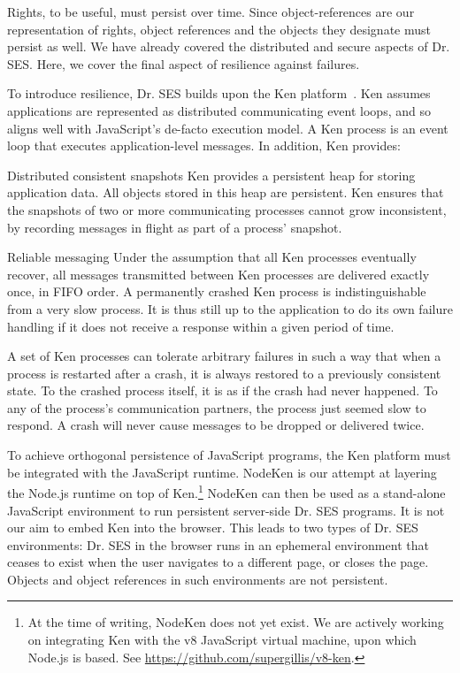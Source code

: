 \documentclass{llncs}
\begin{document}
Rights, to be useful, must persist over time. Since object-references are our representation of rights, object references and the objects they designate must persist as well. We have already covered the distributed and secure aspects of Dr. SES. Here, we cover the final aspect of resilience against failures.

To introduce resilience, Dr. SES builds upon the Ken platform~\cite{Yoo:CKen}. Ken assumes applications are represented as distributed communicating event loops, and so aligns well with JavaScript's de-facto execution model. A Ken process is an event loop that executes application-level messages. In addition, Ken provides:

\begin{description*}
  \item[Distributed consistent snapshots] Ken provides a persistent heap for storing application data. All objects stored in this heap are persistent. Ken ensures that the snapshots of two or more communicating processes cannot grow inconsistent, by recording messages in flight as part of a process' snapshot.
  \item[Reliable messaging] Under the assumption that all Ken processes eventually recover, all messages transmitted between Ken processes are delivered exactly once, in FIFO order. A permanently crashed Ken process is indistinguishable from a very slow process. It is thus still up to the application to do its own failure handling if it does not receive a response within a given period of time.
\end{description*}

A set of Ken processes can tolerate arbitrary failures in such a way that when a process is restarted after a crash, it is always restored to a previously consistent state. To the crashed process itself, it is as if the crash had never happened. To any of the process's communication partners, the process just seemed slow to respond. A crash will never cause messages to be dropped or delivered twice.

To achieve orthogonal persistence of JavaScript programs, the Ken platform must be integrated with the JavaScript runtime. NodeKen is our attempt at layering the Node.js runtime on top of Ken.\footnote{
%
At the time of writing, NodeKen does not yet exist. We are actively working on integrating Ken with the v8 JavaScript virtual machine, upon which Node.js is based. See \url{https://github.com/supergillis/v8-ken}.
%
} NodeKen can then be used as a stand-alone JavaScript environment to run persistent server-side Dr. SES programs. It is not our aim to embed Ken into the browser. This leads to two types of Dr. SES environments: Dr. SES in the browser runs in an ephemeral environment that ceases to exist when the user navigates to a different page, or closes the page. Objects and object references in such environments are not persistent. 
\end{document}
